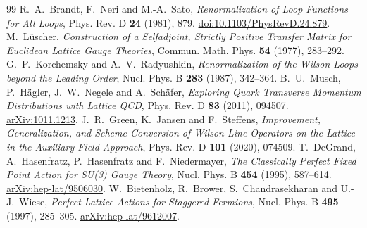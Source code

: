 \documentclass[11pt]{preprint}
\numberwithin{equation}{section}
\begin{document}
\begin{thebibliography}{99}
 R.~A.~Brandt, F.~Neri and M.-A.~Sato,
\emph{Renormalization of Loop Functions for All Loops}, Phys. Rev. D \textbf{24} (1981), 879. \href{https://doi.org/10.1103/PhysRevD.24.879}{doi:10.1103/PhysRevD.24.879}.
 M.~L\"uscher,
\emph{Construction of a Selfadjoint, Strictly Positive Transfer Matrix for Euclidean Lattice Gauge Theories}, Commun. Math. Phys. \textbf{54} (1977), 283--292.
 G.~P.~Korchemsky and A.~V.~Radyushkin,
\emph{Renormalization of the Wilson Loops beyond the Leading Order}, Nucl. Phys. B \textbf{283} (1987), 342--364.
 B.~U.~Musch, P.~H\"agler, J.~W.~Negele and A.~Sch\"afer,
\emph{Exploring Quark Transverse Momentum Distributions with Lattice QCD}, Phys. Rev. D \textbf{83} (2011), 094507. \href{https://arxiv.org/abs/1011.1213}{arXiv:1011.1213}.
 J.~R.~Green, K.~Jansen and F.~Steffens,
\emph{Improvement, Generalization, and Scheme Conversion of Wilson-Line Operators on the Lattice in the Auxiliary Field Approach}, Phys. Rev. D \textbf{101} (2020), 074509.
 T.~DeGrand, A.~Hasenfratz, P.~Hasenfratz and
F.~Niedermayer, \emph{The Classically Perfect Fixed Point Action for SU(3) Gauge Theory}, Nucl. Phys. B \textbf{454} (1995), 587--614. \href{https://arxiv.org/abs/hep-lat/9506030}{arXiv:hep-lat/9506030}.
 W.~Bietenholz, R.~Brower, S.~Chandrasekharan and
U.-J.~Wiese, \emph{Perfect Lattice Actions for Staggered Fermions}, Nucl. Phys. B \textbf{495} (1997), 285--305. \href{https://arxiv.org/abs/hep-lat/9612007}{arXiv:hep-lat/9612007}.
\end{thebibliography}
\end{document}
